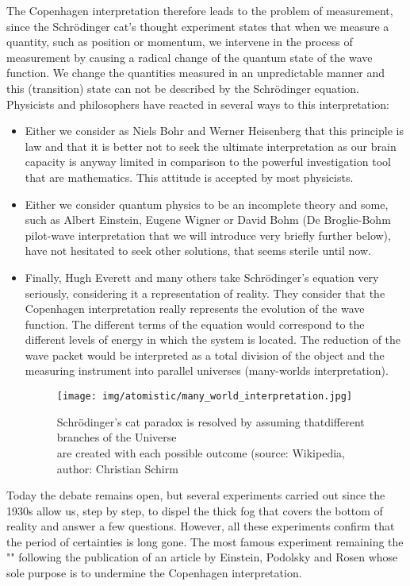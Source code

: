 	The Copenhagen interpretation therefore leads to the problem of measurement, since the Schrödinger cat's thought experiment states that when we measure a quantity, such as position or momentum, we intervene in the process of measurement by causing a radical change of the quantum state of the wave function. We change the quantities measured in an unpredictable manner and this (transition) state can not be described by the Schrödinger equation. Physicists and philosophers have reacted in several ways to this interpretation:
	\begin{itemize}
		\item Either we consider as Niels Bohr and Werner Heisenberg that this principle is law and that it is better not to seek the ultimate interpretation as our brain capacity is anyway limited in comparison to the powerful investigation tool that are mathematics. This attitude is accepted by most physicists.
		
		\item Either we consider quantum physics to be an incomplete theory and some, such as Albert Einstein, Eugene Wigner or David Bohm (De Broglie-Bohm pilot-wave interpretation that we will introduce very briefly further below), have not hesitated to seek other solutions, that seems sterile until now.
		
		\item Finally, Hugh Everett and many others take Schrödinger's equation very seriously, considering it a representation of reality. They consider that the  Copenhagen interpretation really represents the evolution of the wave function. The different terms of the equation would correspond to the different levels of energy in which the system is located. The reduction of the wave packet would be interpreted as a total division of the object and the measuring instrument into parallel universes (many-worlds interpretation).
		\begin{figure}[H]
			\centering
			\texttt{[image: img/atomistic/many\_world\_interpretation.jpg]}
			\caption[]{Schrödinger's cat paradox is resolved by assuming thatdifferent branches of the Universe\\ are created with each possible outcome (source: Wikipedia, author: Christian Schirm}
		\end{figure}
	\end{itemize}
	
	Today the debate remains open, but several experiments carried out since the 1930s allow us, step by step, to dispel the thick fog that covers the bottom of reality and answer a few questions. However, all these experiments confirm that the period of certainties is long gone. The most famous experiment remaining the "" following the publication of an article by Einstein, Podolsky and Rosen whose sole purpose is to undermine the Copenhagen interpretation.
	
